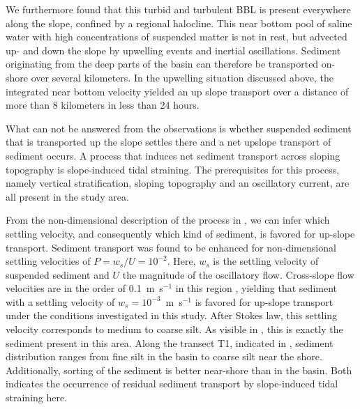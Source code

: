 We furthermore found that this turbid and turbulent BBL is present everywhere 
along the slope, confined by a regional halocline. This near bottom pool of 
saline water with high concentrations of suspended matter is not in rest, but 
advected up- and down the slope by upwelling events and inertial oscillations. 
Sediment originating from the deep parts of the basin can therefore be 
transported on-shore over several kilometers. In the upwelling situation 
discussed above, the integrated near bottom velocity yielded an up slope 
transport over a distance of more than 8 kilometers in less than 24 hours. 

What can not be answered from the observations is whether suspended sediment 
that is transported up the slope settles there and a net upslope transport of 
sediment occurs. A process that induces net sediment transport across sloping 
topography is slope-induced tidal straining. The prerequisites for this 
process, namely vertical stratification, sloping topography and an oscillatory 
current, are all present in the study area. 

From the non-dimensional description of the process in \cite{schulzumlauf2016}, 
we can infer which settling velocity, and consequently which kind of sediment, 
is favored for up-slope transport. Sediment transport was found 
to be enhanced for non-dimensional settling velocities of $P= w_s \slash U = 
10^{-2}$. Here, $w_s$ is the settling velocity of suspended sediment and $U$ 
the magnitude of the oscillatory flow. Cross-slope flow velocities are in the 
order of 0.1~m~s$^{-1}$ in this region \citep[][]{lass1993}, yielding that 
sediment with a settling velocity of $w_s=10^{-3}$~m~s$^{-1}$ is favored for 
up-slope transport under the conditions investigated in this study. After 
Stokes law, this settling velocity corresponds to medium to coarse silt. As 
visible in , this is exactly the sediment present in this 
area. Along the transect T1, indicated in , sediment 
distribution ranges from fine silt in the basin to coarse silt near the shore. 
Additionally, sorting of the sediment is better near-shore than in the basin. 
Both indicates the occurrence of residual sediment transport by slope-induced 
tidal straining here.

